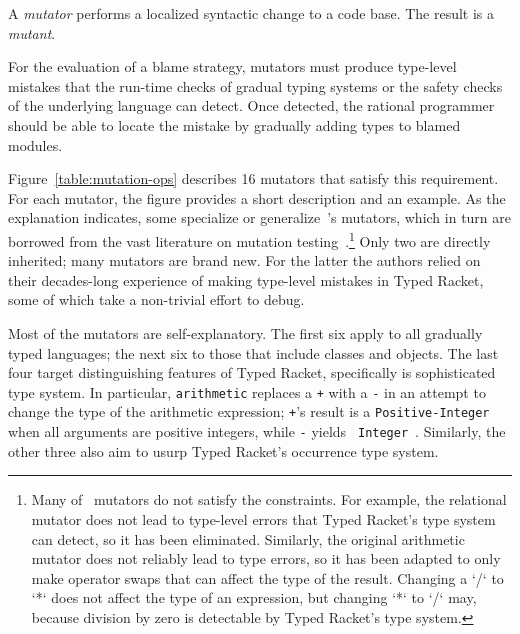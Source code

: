 
A {\it mutator\/} performs a localized syntactic change to a code base. The
result is a {\em mutant\/}.

For the evaluation of a blame strategy, mutators must produce type-level
mistakes that the run-time checks of gradual typing systems or the safety
checks of the underlying language can detect. Once detected, the rational
programmer should be able to locate the mistake by gradually adding types to
blamed modules.

Figure~\ref{table:mutation-ops} describes 16 mutators that satisfy this
requirement.  For each mutator, the figure provides a short description and an
example. As the explanation indicates, some specialize or
generalize~\citet{lksfd-popl-2020}'s mutators, which in turn are borrowed from
the vast literature on mutation testing~\cite{jia2011analysis}.\footnote{Many
of~\citet{lksfd-popl-2020} mutators do not satisfy the constraints. For
example, the relational mutator does not lead to type-level errors that Typed
Racket's type system can detect, so it has been eliminated. Similarly, the
original arithmetic mutator does not reliably lead to type errors, so it has
been adapted to only make operator swaps that can affect the type of the
result. Changing a `/` to `*` does not affect the type of an expression, but
changing `*` to `/` may, because division by zero is detectable by Typed
Racket's type system.}  Only two are directly inherited; many mutators are
brand new. For the latter the authors relied on their decades-long experience
of making type-level mistakes in Typed Racket, some of which take a non-trivial
effort to debug.

Most of the mutators are self-explanatory.  The first six apply to all
gradually typed languages; the next six to those that include classes and
objects. The last four target distinguishing features of Typed Racket,
specifically is sophisticated type system. In particular, {\tt arithmetic}
replaces a {\tt +} with a {\tt -} in an attempt to change the type of the
arithmetic expression; {\tt +}'s result is a {\tt Positive-Integer} when all
arguments are positive integers, while {\tt -} yields {\tt
Integer}~\cite{stathff-padl-12}. Similarly, the other three also aim to usurp
Typed Racket's occurrence type system.

